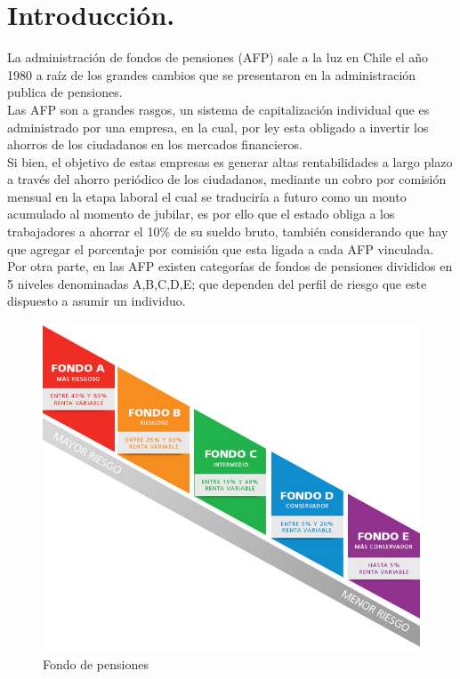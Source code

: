 \documentclass{udpreport}
\begin{document}
\chapter{Introducción.}
La administración de fondos de pensiones (AFP) sale a la luz en Chile el año 1980 a raíz de los grandes cambios que se presentaron en la administración publica de pensiones. \\
Las AFP son a grandes rasgos, un sistema de capitalización individual que es administrado por una empresa, en la cual, por ley esta obligado a invertir los ahorros de los ciudadanos en los mercados financieros. 
\\
Si bien, el objetivo de estas empresas es generar altas rentabilidades a largo plazo a través del ahorro periódico de los ciudadanos, mediante un cobro por comisión mensual en la etapa laboral el cual se traduciría a futuro como un monto acumulado al momento de jubilar, es por ello que el estado obliga a los trabajadores a ahorrar el 10\% de su sueldo bruto, también considerando que hay que agregar el porcentaje por comisión que esta ligada a cada AFP vinculada.
\\ Por otra parte, en las AFP existen categorías de fondos de pensiones  divididos en 5 niveles denominadas A,B,C,D,E; que dependen del perfil de riesgo que este dispuesto a asumir un individuo.
\\
\begin{figure}[H]
    \centering
    \includegraphics [scale=0.3]{images/multifondos.jpg}
    \caption{Fondo de pensiones}
    
\end{figure}
\end{document}
